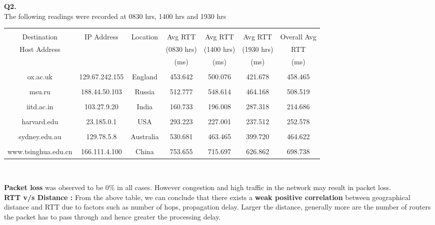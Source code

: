 \documentclass[12pt]{report}
\begin{document}
	\vspace*{0px}
	\large{\textbf{Q2.}}\\
	\linebreak[1]
	\normalsize{}
	\hspace*{1cm}The following readings were recorded at 0830 hrs, 1400 hrs and 1930 hrs\\[2pt]
	\begin{center}
	\begin{tabular}{| c | c | c | c | c | c | c |}
		\hline
		& & & & & &\\[1pt]
		Destination & IP Address & Location & Avg RTT & Avg RTT & Avg RTT & Overall Avg\\[1pt]
		Host Address & & & (0830 hrs) & (1400 hrs) & (1930 hrs) & RTT \\[1pt]
		 & & & (ms) & (ms) & (ms) & (ms) \\[1pt]
		\hline
		& & & & & &\\[1pt]
		ox.ac.uk & 129.67.242.155 & England & 453.642 & 500.076 & 421.678 & 458.465\\[1pt]
		\hline
		& & & & & &\\[1pt]
		msu.ru & 188.44.50.103 & Russia & 512.777 & 548.614 & 464.168 & 508.519\\[1pt]
		\hline
		& & & & & &\\[1pt]
		iitd.ac.in & 103.27.9.20 & India & 160.733 & 196.008 & 287.318 & 214.686\\[1pt]
		\hline
		& & & & & &\\[1pt]
		harvard.edu & 23.185.0.1 & USA & 293.223 & 227.001 & 237.512 & 252.578\\[1pt]
		\hline
		& & & & & &\\[1pt]
		sydney.edu.au & 129.78.5.8 & Australia & 530.681 & 463.465 & 399.720 & 464.622\\[1pt]
		\hline
		& & & & & &\\[1pt]
		www.tsinghua.edu.cn & 166.111.4.100 & China & 753.655 & 715.697 & 626.862 & 698.738\\[1pt]
		\hline
	\end{tabular}
	\\[10pt]
	\end{center}
	\hspace*{1cm} \textbf{Packet loss} was observed to be 0\% in all cases. However congestion and high traffic in the network may result in packet loss.\\[1pt]
	\hspace*{1cm} \textbf{RTT v/s Distance :} From the above table, we can conclude that there exists a \textbf{weak positive correlation} between geographical distance and RTT due to factors such as number of hops, propagation delay. Larger the distance, generally more are the number of routers the packet has to pass through and hence greater the processing delay.\\[1pt]
\end{document}
